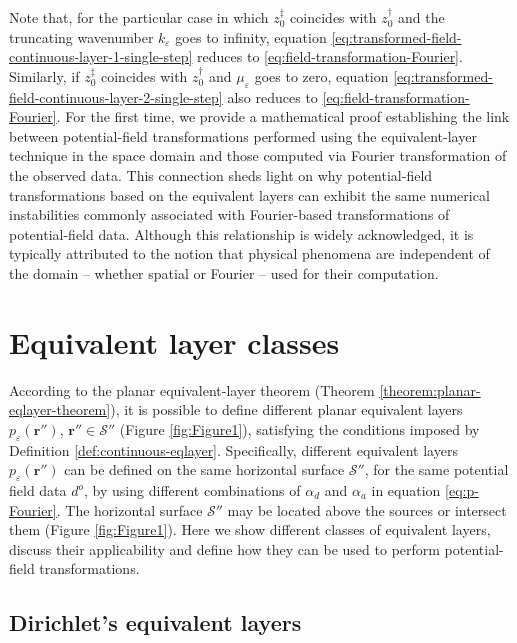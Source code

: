 \documentclass[manuscript,noblind]{geophysics}
\begin{document}
	Note that, for the particular case in which $z^{\ddagger}_{0}$ coincides with $z^{\dagger}_{0}$ and 
	the truncating wavenumber $k_{\varepsilon}$ goes to infinity, equation 
	\ref{eq:transformed-field-continuous-layer-1-single-step} reduces to \ref{eq:field-transformation-Fourier}.
	Similarly, if $z^{\ddagger}_{0}$ coincides with $z^{\dagger}_{0}$ and $\mu_{\varepsilon}$ goes to zero,
	equation \ref{eq:transformed-field-continuous-layer-2-single-step} also reduces to \ref{eq:field-transformation-Fourier}.
	For the first time, we provide a mathematical proof establishing the link between
	potential-field transformations performed using the equivalent-layer technique in 
	the space domain and those computed via Fourier transformation of the observed data.
	This connection sheds light on why potential-field transformations based on the
	equivalent layers can exhibit the same numerical instabilities commonly associated
	with Fourier-based transformations of potential-field data. Although this
	relationship is widely acknowledged, it is typically attributed to the notion that
	physical phenomena are independent of the domain -- whether spatial or Fourier --
	used for their computation.
	
	\section{Equivalent layer classes}
	\label{sec:eqlayer_classes}
	
	According to the planar equivalent-layer theorem (Theorem \ref{theorem:planar-eqlayer-theorem}), 
	it is possible to define different planar equivalent layers $p_{\varepsilon}(\mathbf{r}'')$, 
	$\mathbf{r}'' \in \mathcal{S}''$ (Figure \ref{fig:Figure1}), 
	satisfying the conditions imposed by Definition \ref{def:continuous-eqlayer}.
	Specifically, different equivalent layers $p_{\varepsilon}(\mathbf{r}'')$ can be defined
	on the same horizontal surface $\mathcal{S}''$, for the same potential field data $d^{o}$, 
	by using different combinations of $\alpha_{d}$ and $\alpha_{a}$ in equation \ref{eq:p-Fourier}. 
	The horizontal surface $\mathcal{S}''$ may be located above the sources 
	or intersect them (Figure \ref{fig:Figure1}).
	Here we show different classes of equivalent layers, discuss their applicability and define how they 
	can be used to perform potential-field transformations.
	
	\subsection{Dirichlet's equivalent layers}
	
\end{document}
